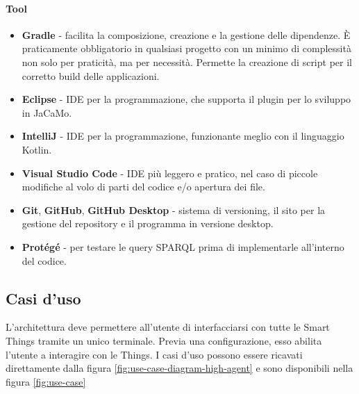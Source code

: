 \documentclass[12pt,a4paper,openright,oneside]{report}
\begin{document}
\paragraph{Tool}
\begin{itemize}
	\item \textbf{Gradle} \cite{gradle} - facilita la composizione, creazione e la gestione delle dipendenze. È praticamente obbligatorio in qualsiasi progetto con un minimo di complessità non solo per praticità, ma per necessità. Permette la creazione di script per il corretto build delle applicazioni.
	
	\item \textbf{Eclipse} \cite{eclipse} - IDE per la programmazione, che supporta il plugin per lo sviluppo in JaCaMo.
	
	\item \textbf{IntelliJ} \cite{intellij} - IDE per la programmazione, funzionante meglio con il linguaggio Kotlin.
	
	\item \textbf{Visual Studio Code} \cite{visualstudiocode} - IDE più leggero e pratico, nel caso di piccole modifiche al volo di parti del codice e/o apertura dei file.
	
	\item \textbf{Git}, \textbf{GitHub}, \textbf{GitHub Desktop} \cite{git} - sistema di versioning, il sito per la gestione del repository e il programma in versione desktop.
	
	\item \textbf{Protégé} - per testare le query SPARQL prima di implementarle all'interno del codice.
\end{itemize}

\subsection{Casi d'uso}
L'architettura deve permettere all'utente di interfacciarsi con tutte le Smart Things tramite un unico terminale. Previa una configurazione, esso abilita l'utente a interagire con le Things. I casi d'uso possono essere ricavati direttamente dalla figura \ref{fig:use-case-diagram-high-agent} e sono disponibili nella figura \ref{fig:use-case}
\end{document}
